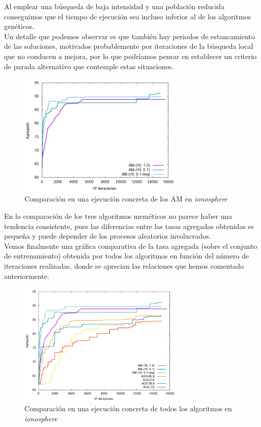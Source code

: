 \documentclass[12pt]{article}
\begin{document}
Al emplear una búsqueda de baja intensidad y una población reducida conseguimos que el tiempo de ejecución sea incluso inferior al de los algoritmos genéticos.\\

Un detalle que podemos observar es que también hay periodos de estancamiento de las soluciones, motivados probablemente por iteraciones de la búsqueda local que no conducen a mejora, por lo que podríamos pensar en establecer un criterio de parada alternativo que contemple estas situaciones.

\begin{figure}[ht!]
    \centering
    \includegraphics[width=0.7\textwidth]{img/am.png}
	\caption{Comparación en una ejecución concreta de los AM en \textit{ionosphere}}
\end{figure}

En la comparación de los tres algoritmos meméticos no parece haber una tendencia consistente, pues las diferencias entre las tasas agregadas obtenidas es pequeña y puede depender de los procesos aleatorios involucrados.\\

Vemos finalmente una gráfica comparativa de la tasa agregada (sobre el conjunto de entrenamiento) obtenida por todos los algoritmos en función del número de iteraciones realizadas, donde se aprecian las relaciones que hemos comentado anteriormente.\\

\begin{figure}[ht!]
    \centering
    \includegraphics[width=0.7\textwidth]{img/todos.png}
	\caption{Comparación en una ejecución concreta de todos los algoritmos en \textit{ionosphere}}
\end{figure}
\end{document}

